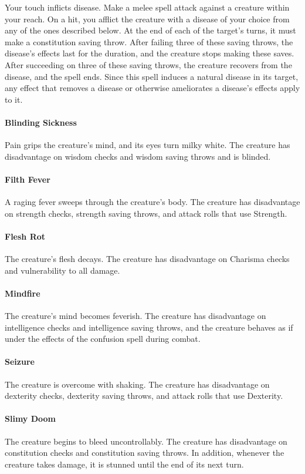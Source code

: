 \documentclass[a5paper, 12pt]{memoir}
\begin{document}
\vspace{1\baselineskip}\noindent Your touch inflicts disease. Make a melee spell attack against a creature within your reach. On a hit, you afflict the creature with a disease of your choice from any of the ones described below. At the end of each of the target's turns, it must make a constitution saving throw. After failing three of these saving throws, the disease's effects last for the duration, and the creature stops making these saves. After succeeding on three of these saving throws, the creature recovers from the disease, and the spell ends. Since this spell induces a natural disease in its target, any effect that removes a disease or otherwise ameliorates a disease's effects apply to it. \paragraph{Blinding Sickness} Pain grips the creature's mind, and its eyes turn milky white. The creature has disadvantage on wisdom checks and wisdom saving throws and is blinded. \paragraph{Filth Fever} A raging fever sweeps through the creature's body. The creature has disadvantage on strength checks, strength saving throws, and attack rolls that use Strength. \paragraph{Flesh Rot} The creature's flesh decays. The creature has disadvantage on Charisma checks and vulnerability to all damage. \paragraph{Mindfire} The creature's mind becomes feverish. The creature has disadvantage on intelligence checks and intelligence saving throws, and the creature behaves as if under the effects of the confusion spell during combat. \paragraph{Seizure} The creature is overcome with shaking. The creature has disadvantage on dexterity checks, dexterity saving throws, and attack rolls that use Dexterity. \paragraph{Slimy Doom} The creature begins to bleed uncontrollably. The creature has disadvantage on constitution checks and constitution saving throws. In addition, whenever the creature takes damage, it is stunned until the end of its next turn.
\end{document}

